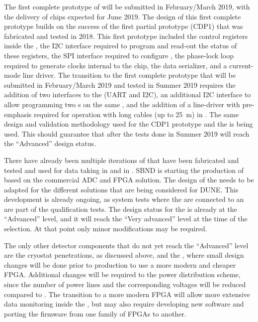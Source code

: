 The first complete prototype of  will be submitted in 
February/March 2019, with the delivery of chips expected for June 2019.
The design of this first complete prototype builds on the success of
the first partial prototype (CDP1) that was fabricated and tested in 2018.
This first prototype included the control registers inside the 
, the I2C interface required to program and read-out
the status of these registers, the SPI interface required to
configure , the phase-lock loop required to generate
clocks internal to the chip, the data serializer, and a current-mode
line driver. The transition to the first complete prototype that
will be submitted in February/March 2019 and tested in Summer 2019
requires the addition of two interfaces to the  (UART
and I2C), an additional I2C interface to allow programming two
 s on the same , and the
addition of a line-driver with pre-emphasis required for operation
with long cables (up to \SI{25}{m}) in \lar. The same design and
validation methodology used for the CDP1 prototype and the 
is being used. This should guarantee that after the tests done in
Summer 2019  will reach the ``Advanced'' design 
status. 

There have already been multiple iterations of  that
have been fabricated and tested and used for data taking in 
 and in . SBND is starting the
production of  based on the commercial ADC and
FPGA solution. The design of the  needs to be adapted
for the different  solutions that are being considered
for DUNE. This development is already ongoing, as system tests 
where the  are connected to an  are part
of the qualification tests. The design status for the 
is already at the ``Advanced'' level, and it will reach the 
``Very advanced'' level at the time of the 
selection. At that point only minor modifications may be
required. 

The only other  detector components that do not yet
reach the ``Advanced'' level are the cryostat penetrations, as
discussed above, and the , where small
design changes will be done prior to production to use a more
modern and cheaper FPGA. Additional changes will be required to
the power distribution scheme, since the number of power lines
and the corresponding voltages will be reduced compared to
. The transition to a more modern FPGA will allow 
more extensive data monitoring inside the , but may
also require developing new software and porting the firmware
from one family of FPGAs to another. 

